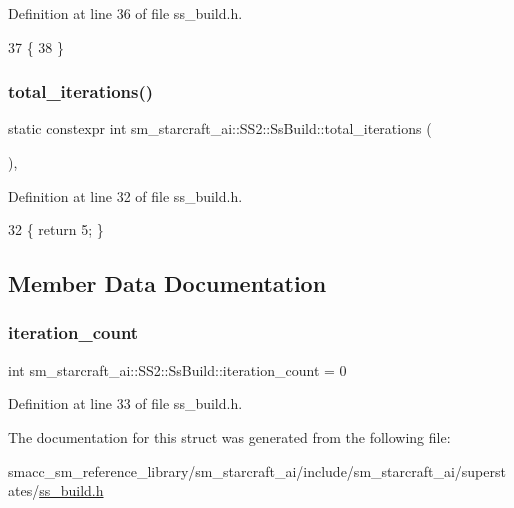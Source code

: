 Definition at line 36 of file ss\+\_\+build.\+h.


\begin{DoxyCode}
37     \{
38     \}
\end{DoxyCode}
\mbox{\label{structsm__starcraft__ai_1_1SS2_1_1SsBuild_a2f1a89dd07833fdcec8e3a80b1b8af86}} 
\subsubsection{\texorpdfstring{total\+\_\+iterations()}{total\_iterations()}}
{\footnotesize\ttfamily static constexpr int sm\+\_\+starcraft\+\_\+ai\+::\+S\+S2\+::\+Ss\+Build\+::total\+\_\+iterations (\begin{DoxyParamCaption}{ }\end{DoxyParamCaption})\hspace{0.3cm}{\ttfamily [inline]}, {\ttfamily [static]}}



Definition at line 32 of file ss\+\_\+build.\+h.


\begin{DoxyCode}
32 \{ \textcolor{keywordflow}{return} 5; \}
\end{DoxyCode}


\subsection{Member Data Documentation}
\mbox{\label{structsm__starcraft__ai_1_1SS2_1_1SsBuild_abd2de17a6f6647b5c3da117b4ac7d02b}} 
\subsubsection{\texorpdfstring{iteration\+\_\+count}{iteration\_count}}
{\footnotesize\ttfamily int sm\+\_\+starcraft\+\_\+ai\+::\+S\+S2\+::\+Ss\+Build\+::iteration\+\_\+count = 0}



Definition at line 33 of file ss\+\_\+build.\+h.



The documentation for this struct was generated from the following file\+:\begin{DoxyCompactItemize}
\item 
smacc\+\_\+sm\+\_\+reference\+\_\+library/sm\+\_\+starcraft\+\_\+ai/include/sm\+\_\+starcraft\+\_\+ai/superstates/\hyperlink{ss__build_8h}{ss\+\_\+build.\+h}\end{DoxyCompactItemize}
